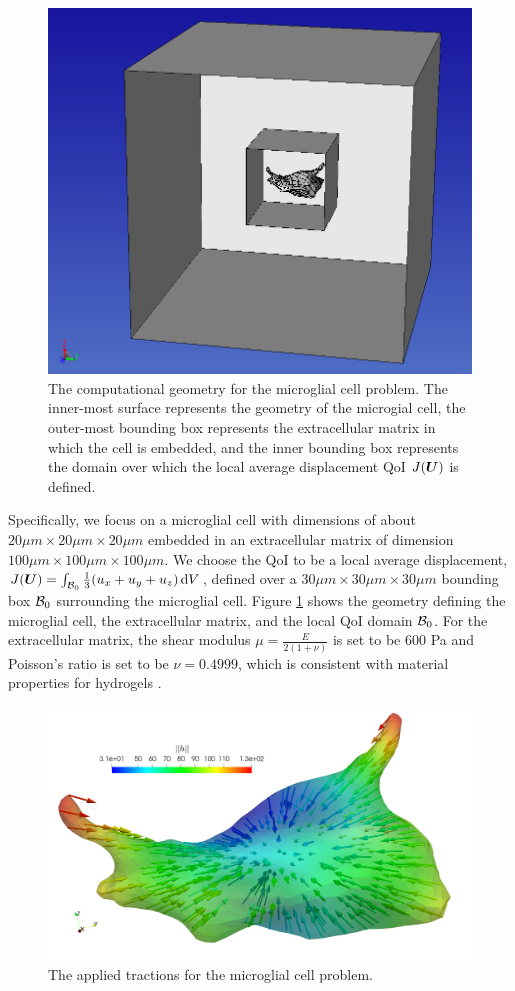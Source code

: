 \begin{figure}[ht!]
\centering
\includegraphics[width=.6\linewidth]{img/mech_glial_geom.png}
\centering
\caption{The computational geometry for the microglial cell problem. The
inner-most surface represents the geometry of the microgial cell, the
outer-most bounding box represents the extracellular matrix in which the
cell is embedded, and the inner bounding box represents the domain over
which the local average displacement QoI $J(\boldsymbol{U})$ is defined.}
\label{fig:mech_glial_geom}
\end{figure}

Specifically, we focus on a microglial cell with dimensions of about
$20 \mu m \times 20 \mu m \times 20 \mu m$ embedded in an extracellular matrix
of dimension $100 \mu m \times 100 \mu m \times 100 \mu m$. We choose the
QoI to be a local average displacement,
$J(\boldsymbol{U}) = \int_{\mathcal{B}_0} \frac13 (u_x + u_y + u_z) \, \text{d} V$, defined
over a $30 \mu m \times 30 \mu m \times 30 \mu m$ bounding box $\mathcal{B}_0$
surrounding the microglial cell. Figure \ref{fig:mech_glial_geom} shows the
geometry defining the microglial cell, the extracellular matrix, and the
local QoI domain $\mathcal{B}_0$. For the extracellular matrix,
the shear modulus $\mu = \frac{E}{2(1 + \nu)}$ is set to be 600 Pa and
Poisson's ratio is set to be $\nu = 0.4999$, which is consistent with
material properties for hydrogels
\cite{legant2010measurement, paszek2005tensional, discher2005tissue}.

\begin{figure}[ht!]
\centering
\includegraphics[width=.6\linewidth]{img/mech_glial_applied_traction.png}
\centering
\caption{The applied tractions for the microglial cell problem.}
\label{fig:mech_glial_traction}
\end{figure}

